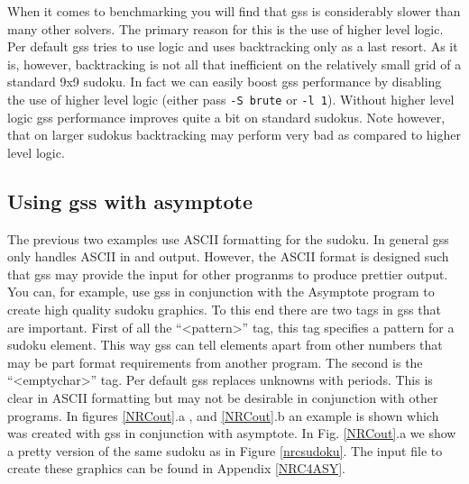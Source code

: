 \documentclass[12pt]{article}
\begin{document}
When it comes to benchmarking you will find that gss is considerably slower than many other solvers. The primary reason for this is the use of higher level logic.
Per default gss tries to use logic and uses backtracking only as a last resort. As it is, however, backtracking is not all that inefficient on the relatively small grid of a standard 9x9 sudoku. In fact we can easily boost gss performance by disabling the use of higher level logic (either pass  \texttt{-S brute} or \texttt{-l 1}). Without higher level logic gss performance improves quite a bit on standard sudokus. Note however, that on larger sudokus backtracking may perform very bad as compared to higher level logic.

\subsection{Using gss with asymptote}
The previous two examples use ASCII formatting for the sudoku. In general gss only handles ASCII in and output. However, the ASCII format is designed such that gss may provide the input for other progranms to produce prettier output. You can, for example, use gss in conjunction with the Asymptote program to create high quality sudoku graphics. To this end there are two tags in gss that are important. First of all the  ``\textless pattern\textgreater '' tag, this tag specifies a pattern for a sudoku element. This way gss can tell elements apart from other numbers that may be part format requirements from another program. The second is the ``\textless emptychar\textgreater '' tag. Per default gss replaces unknowns with periods. This is clear in ASCII formatting but may not be desirable in conjunction with other programs. In figures \ref{NRCout}.a , and \ref{NRCout}.b an example is shown which was created with gss in conjunction with asymptote. In Fig. \ref{NRCout}.a we show a pretty version of the same sudoku as in Figure \ref{nrcsudoku}. The input file to create these graphics can be found in Appendix \ref{NRC4ASY}.
\end{document}
